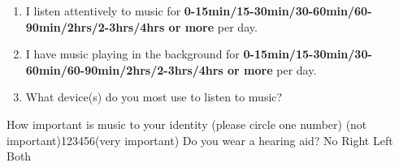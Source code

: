 \documentclass[12pt, a4paper]{article}
\begin{document}
\begin{enumerate}
\item I listen attentively to music for \textbf{0-15min\hspace{2pt}/\hspace{2pt}15-30min\hspace{2pt}/\hspace{2pt}30-60min\hspace{2pt}/\hspace{2pt}60-90min\hspace{2pt}/\hspace{2pt}2hrs\hspace{2pt}/\hspace{2pt}2-3hrs\hspace{2pt}/\hspace{2pt}4hrs or more} per day.
\item I have music playing in the background for \textbf{0-15min\hspace{2pt}/\hspace{2pt}15-30min\hspace{2pt}/\hspace{2pt}30-60min\hspace{2pt}/\hspace{2pt}60-90min\hspace{2pt}/\hspace{2pt}2hrs\hspace{2pt}/\hspace{2pt}2-3hrs\hspace{2pt}/\hspace{2pt}4hrs or more} per day.
\item What device(s) do you most use to listen to music? \hrulefill
\end{enumerate}
\vspace{10pt}
\noindent How important is music to your identity (please circle one number)
\vspace{8pt}
\newline (not important)\hspace{12pt}1\hspace{12pt}2\hspace{12pt}3\hspace{12pt}4\hspace{12pt}5\hspace{12pt}6\hspace{12pt}(very important) 
\vspace{8pt}
\newline Do you wear a hearing aid?\hspace{6pt} No \hspace{6pt} Right \hspace{6pt} Left \hspace{6pt} Both
\end{document}
